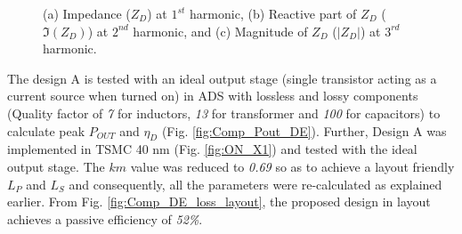 \documentclass[conference]{IEEEtran}
\begin{document}
\begin{figure}[!t]
\begin{subfigure}{0.24\textwidth}
\caption{}
\label{fig:Comp_3H_Mag}
\end{subfigure}
\caption{(a) Impedance ($Z_D$) at $1^{st}$ harmonic, (b) Reactive part of $Z_D$ ($\Im(Z_D)$) at $2^{nd}$ harmonic, and (c) Magnitude of $Z_D$ ($|Z_D|$) at $3^{rd}$ harmonic.}
\label{fig:Comp_1H_2H_3H}
\vspace{-0.1in}
\end{figure}
The design A is tested with an ideal output stage (single transistor acting  as a current source when turned on) in ADS with lossless and lossy components
(Quality factor of \textit{7} for inductors, \textit{13} for transformer and \textit{100} for capacitors) 
to calculate peak $P_{OUT}$ and $\eta_D$ (Fig. \ref{fig:Comp_Pout_DE}). 
Further, Design A was implemented in TSMC 40 nm (Fig. \ref{fig:ON_X1}) and tested with the ideal output stage. The $km$ value was reduced to \textit{0.69} so as to achieve a layout friendly $L_P$ and $L_S$ and consequently, all the parameters were re-calculated as explained earlier. From Fig. \ref{fig:Comp_DE_loss_layout}, the proposed design in layout achieves a passive efficiency of \textit{52\%}.
\end{document}
